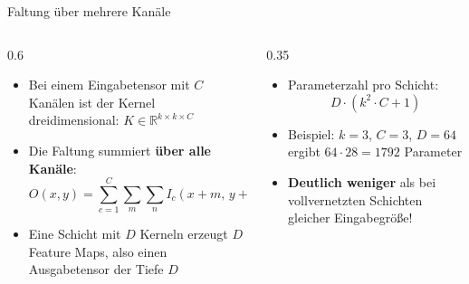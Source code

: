 {%
\begin{frame}{Faltung über mehrere Kanäle}
\begin{columns}
\begin{column}{0.6\textwidth}
\begin{itemize}
    \item Bei einem Eingabetensor mit $C$ Kanälen ist der Kernel dreidimensional: $K \in \mathbb{R}^{k \times k \times C}$
    \item Die Faltung summiert \textbf{über alle Kanäle}:
    \[
        O(x, y) = \sum_{c=1}^{C} \sum_{m} \sum_{n} I_c(x + m,\, y + n)\, K_c(m, n) + b
    \]
    \item Eine Schicht mit $D$ Kerneln erzeugt $D$ Feature Maps, also einen Ausgabetensor der Tiefe $D$
\end{itemize}
\end{column}
\begin{column}{0.35\textwidth}
\begin{itemize}
    \item Parameterzahl pro Schicht:
    \[
        D \cdot (k^2 \cdot C + 1)
    \]
    \item Beispiel: $k = 3$, $C = 3$, $D = 64$ ergibt $64 \cdot 28 = 1792$ Parameter
    \item \textbf{Deutlich weniger} als bei vollvernetzten Schichten gleicher Eingabegröße!
\end{itemize}
\end{column}
\end{columns}
\end{frame}

}
